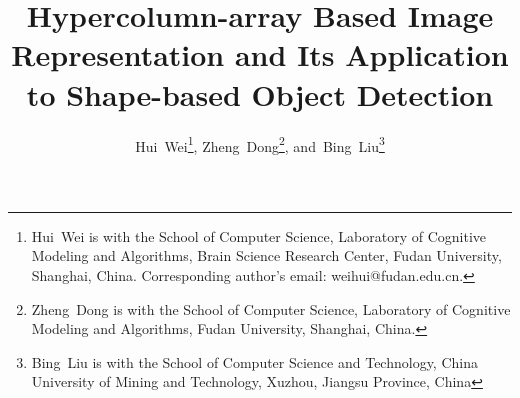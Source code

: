 \documentclass{article}
\begin{document}
\title{Hypercolumn-array Based Image Representation and 
Its Application to Shape-based Object Detection}
\author{Hui~Wei\thanks{Hui~Wei is with the School of Computer Science, 
Laboratory of Cognitive Modeling and Algorithms, 
Brain Science Research Center, Fudan University, Shanghai, China. 
Corresponding author's email: weihui@fudan.edu.cn.},
Zheng~Dong\thanks{Zheng~Dong is with the School of Computer Science, 
Laboratory of Cognitive Modeling and Algorithms, 
Fudan University, Shanghai, China.},
and~Bing~Liu\thanks{Bing~Liu is with the School of Computer Science and Technology,
China University of Mining and Technology, Xuzhou, Jiangsu Province, China}}


\maketitle
\end{document}
